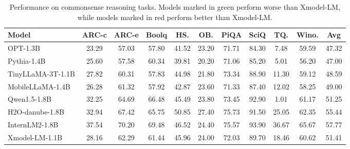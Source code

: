 \documentclass{article}
\newcommand{\llm}{Xmodel-LM\xspace}
\begin{document}
\begin{table}[ht]
  \centering
  \setlength{\tabcolsep}{3pt}
  \begin{tabular}{lcccccccccc}
    \toprule
    Model & \textbf{ARC-c} & \textbf{ARC-e} & \textbf{Boolq} & \textbf{HS.} & \textbf{OB.} & \textbf{PiQA} & \textbf{SciQ} & \textbf{TQ.} & \textbf{Wino.} & \textbf{Avg}\\
    \midrule
    \rowcolor{darkgreen!20}
    OPT-1.3B\xspace&23.29&57.03&57.80&41.52&23.20&71.71&84.30&7.48&59.59&47.32 \\
    \rowcolor{darkgreen!20}
    Pythia-1.4B\xspace&25.60&57.58&60.34&39.81&20.20&71.06&85.20&5.01&56.20&47.00 \\
    \rowcolor{darkgreen!20}
    TinyLLaMA-3T-1.1B\xspace&27.82&60.31&57.83&44.98&21.80&73.34&88.90&11.30&59.12&48.59  \\
    \rowcolor{darkgreen!20}
    MobileLLaMA-1.4B\xspace&26.28&61.32&57.92&42.87&23.60&71.33&87.40&12.02&58.25&49.00 \\
    \rowcolor{darkgreen!20}
    Qwen1.5-1.8B\xspace&32.25&64.69&66.48&45.49&23.80&73.45&92.90&1.01&61.17&51.25 \\
    \rowcolor{darkred!20}
    H2O-danube-1.8B\xspace&32.94&67.42&65.75&50.85&27.40&75.73&91.50&25.05&62.35&55.44 \\
    \rowcolor{darkred!20}
    InternLM2-1.8B\xspace&37.54&70.20&69.48&46.52&24.40&75.57&93.90&36.67&65.67&57.77 \\
    \midrule
    \rowcolor{xdcolor!20}
    \llm-1.1B\xspace&28.16&62.29&61.44&45.96&24.00&72.03&89.70&18.46&60.62&51.41   \\
    \bottomrule
  \end{tabular}
  \newline
  \caption{Performance on commonsense reasoning tasks. Models marked in green perform worse than \llm, while models marked in red perform better than \llm.}
  \label{tab: commonsense}
\end{table}
\end{document}
